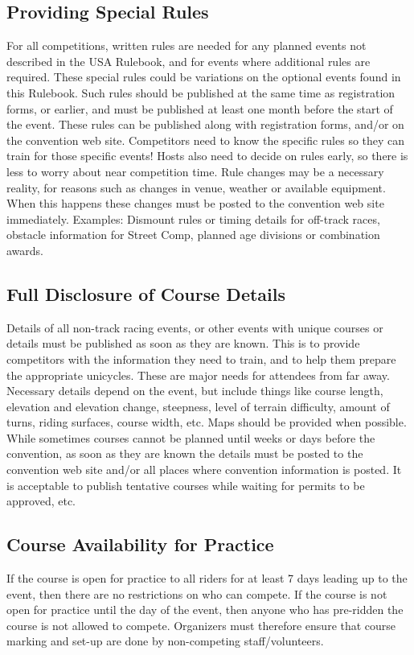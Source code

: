 \subsection{Providing Special Rules}
For all competitions, written rules are needed for any planned events not described in the USA Rulebook, and for events where additional rules are required. 
These special rules could be variations on the optional events found in this Rulebook. 
Such rules should be published at the same time as registration forms, or earlier, and must be published at least one month before the start of the event. 
These rules can be published along with registration forms, and/or on the convention web site. 
Competitors need to know the specific rules so they can train for those specific events! 
Hosts also need to decide on rules early, so there is less to worry about near competition time. 
Rule changes may be a necessary reality, for reasons such as changes in venue, weather or available equipment. 
When this happens these changes must be posted to the convention web site immediately. 
Examples: Dismount rules or timing details for off-track races, obstacle information for Street Comp, planned age divisions or combination awards.

\subsection{Full Disclosure of Course Details}
Details of all non-track racing events, or other events with unique courses or details must be published as soon as they are known. 
This is to provide competitors with the information they need to train, and to help them prepare the appropriate unicycles.
These are major needs for attendees from far away. 
Necessary details depend on the event, but include things like course length, elevation and elevation change, steepness, level of terrain difficulty, amount of turns, riding surfaces, course width, etc.
Maps should be provided when possible. 
While sometimes courses cannot be planned until weeks or days before the convention, as soon as they are known the details must be posted to the convention web site and/or all places where convention information is posted. 
It is acceptable to publish tentative courses while waiting for permits to be approved, etc.

\subsection{Course Availability for Practice}
If the course is open for practice to all riders for at least 7 days leading up to the event, then there are no restrictions on who can compete. 
If the course is not open for practice until the day of the event, then anyone who has pre-ridden the course is not allowed to compete. 
Organizers must therefore ensure that course marking and set-up are done by non-competing staff/volunteers.


